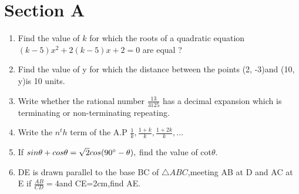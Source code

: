 \documentclass[journal,12pt,twocolumn]{IEEEtran}
\renewcommand\thesection{\arabic{section}}
\begin{document}
\section{Section A}
\renewcommand{\theequation}{\theenumi}
\begin{enumerate}[label=\thesection.\arabic*.,ref=\thesection.\theenumi]
\item Find the value of $k$ for which the roots of a quadratic equation $(k-5)x^2 + 2 (k-5)x + 2=0 $ are equal ?\\
\item Find the value of y for which the distance between the points (2, -3)and (10, y)is 10 units.\\

\item Write whether the rational number $\frac{13}{3125} $ has a decimal expansion which is terminating or non-terminating repeating.\\

\item Write the $n^th$ term of the A.P $\frac{1}{k},\frac{1+k}{k},\frac{1+2k}{k},...$\\

\item If $ sin \theta + cos\theta = \sqrt{2}cos (90\degree - \theta),$ find the value of cot$\theta$. \\

\item DE is drawn parallel to the base BC of $\triangle ABC$,meeting AB at D and AC at E if $\frac{AB}{CD}=4$and CE=2cm,find AE.\\
\end{enumerate}
\end{document}
